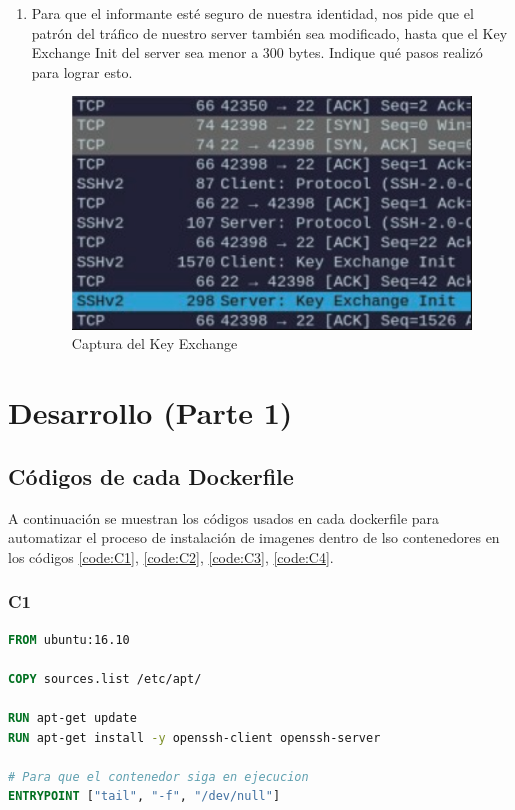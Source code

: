 \documentclass[letter,12pt]{article}
\newcounter{codecount}
\begin{document}
\begin{enumerate}
\item Para que el informante esté seguro de nuestra identidad, nos pide que el patrón del tráfico de nuestro server también sea modificado, hasta que el Key Exchange Init del server sea menor a 300 bytes. Indique qué pasos realizó para lograr esto.

\begin{figure}[ht]
    \centering
    \includegraphics[width=1\linewidth]{Desarrollo/exchange.png}
    \caption{Captura del Key Exchange}
    \label{fig:exchange}
\end{figure}

\end{enumerate}

\clearpage

\section{Desarrollo (Parte 1)}

\subsection{Códigos de cada Dockerfile}

A continuación se muestran los códigos usados en cada dockerfile para automatizar el proceso de instalación de imagenes dentro de lso contenedores en los códigos \ref{code:C1}, \ref{code:C2}, \ref{code:C3}, \ref{code:C4}.

\subsubsection{C1}

\label{code:C1}
\begin{lstlisting}[language=Dockerfile, caption={C1}]
FROM ubuntu:16.10

COPY sources.list /etc/apt/

RUN apt-get update
RUN apt-get install -y openssh-client openssh-server

# Para que el contenedor siga en ejecucion
ENTRYPOINT ["tail", "-f", "/dev/null"]
\end{lstlisting}
\end{document}

